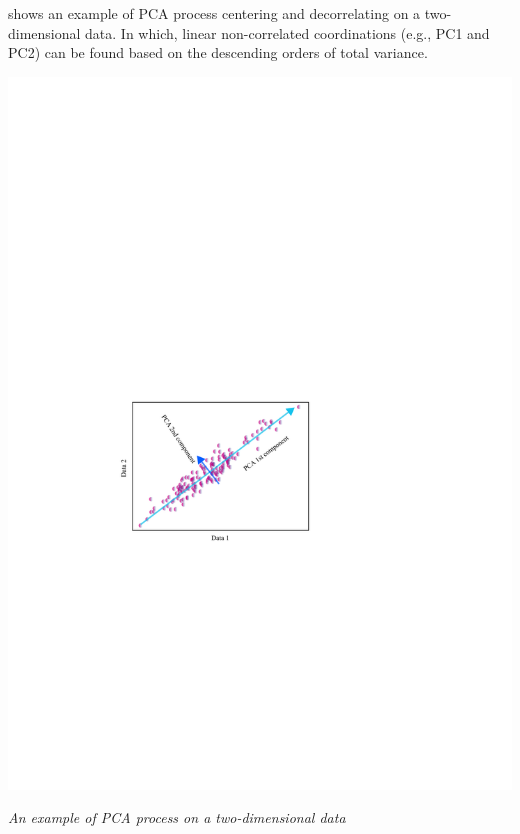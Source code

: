 \documentclass{tufte-handout}
\begin{document}
 shows an example of PCA process centering and decorrelating on a two-dimensional data. In which, linear non-correlated coordinations (e.g., PC1 and PC2) can be found based on the descending orders of total variance. 
\begin{marginfigure}%
  \includegraphics[width=\linewidth]{figures/figure-PCA-2D.pdf}
  \caption{\textit{An example of PCA process on a two-dimensional data}}
  \label{fig: PCA-2D}
\end{marginfigure}
\end{document}
